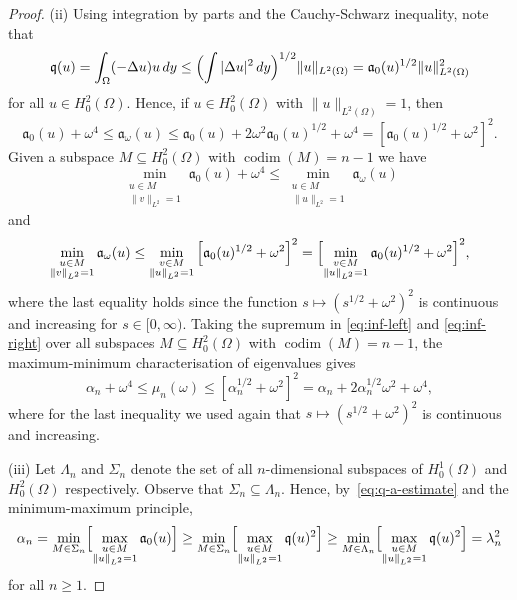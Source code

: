 \documentclass[a4paper, reqno]{amsart}
\numberwithin{equation}{section}
\theoremstyle{plain}
\theoremstyle{definition}
\theoremstyle{remark}
\DeclareMathOperator{\codim}{codim}
\newcommand{\mfra}{\mathfrak{a}}
\newcommand{\mfrq}{\mathfrak{q}}
\begin{document}
\begin{proof}
  (ii) Using integration by parts and the Cauchy-Schwarz inequality, note that
  \begin{equation}
    \label{eq:q-a-estimate}
    \mfrq(u)
    =\int_\Omega (-\Delta u)u\,dy
    \leq \Bigl(\int|\Delta u|^2\,dy\Bigr)^{1/2}\|u\|_{L^2(\Omega)}
    =\mfra_0(u)^{1/2}\|u\|_{L^2(\Omega)}^2
  \end{equation}
  for all $u\in H_0^2(\Omega)$. Hence, if $u\in H_0^2(\Omega)$ with $\|u\|_{L^2(\Omega)}=1$, then
  \begin{equation*}
    \mfra_0(u)+\omega^4
    \leq \mfra_\omega(u)
    \leq \mfra_0(u)+2\omega^2\mfra_0(u)^{1/2}+\omega^4
    =\left[\mfra_0(u)^{1/2}+\omega^2\right]^2.
  \end{equation*}
  Given a subspace $M\subseteq H_0^2(\Omega)$ with $\codim(M)=n-1$ we have
  \begin{equation}
    \label{eq:inf-left}
    \min_{\substack{u\in M\\\|v\|_{L^2}=1}}\mfra_0(u)+\omega^4
    \leq\min_{\substack{u\in M\\\|u\|_{L^2}=1}}\mfra_\omega(u)
  \end{equation}
  and
  \begin{equation}
    \label{eq:inf-right}
    \min_{\substack{u\in M\\\|v\|_{L^2}=1}}\mfra_\omega(u)
    \leq\min_{\substack{v\in M\\\|u\|_{L^2}=1}}
    \left[\mfra_0(u)^{1/2}+\omega^2\right]^2
    =\Bigl[\min_{\substack{v\in M\\\|u\|_{L^2}=1}}\mfra_0(u)^{1/2}+\omega^2\Bigr]^2,
  \end{equation}
  where the last equality holds since the function $s\mapsto (s^{1/2}+\omega^2)^2$ is continuous and increasing for $s\in[0,\infty)$. Taking the supremum in \eqref{eq:inf-left} and \eqref{eq:inf-right} over all subspaces $M\subseteq H_0^2(\Omega)$ with $\codim(M)=n-1$, the maximum-minimum characterisation of eigenvalues gives
  \begin{equation*}
    \alpha_n+\omega^4\leq \mu_n(\omega)
    \leq\left[\alpha_n^{1/2}+\omega^2\right]^2
    =\alpha_n+2\alpha_n^{1/2}\omega^2+\omega^4,
  \end{equation*}
  where for the last inequality we used again that $s\mapsto (s^{1/2}+\omega^2)^2$ is continuous and increasing.

  (iii)  Let $\Lambda_n$ and $\Sigma_n$ denote the set of all $n$-dimensional subspaces of $H^1_0(\Omega)$ and $H^2_0(\Omega)$ respectively. Observe that $\Sigma_n\subseteq\Lambda_n$. Hence, by~\eqref{eq:q-a-estimate} and the minimum-maximum principle,
  \begin{equation*}
    \alpha_n
    = \min_{M \in \Sigma_n} \Bigl[\max_{\substack{u\in M\\\|u\|_{L^2}=1}}\mfra_0(u)\Bigr]
    \geq \min_{M \in \Sigma_n} \Bigl[\max_{\substack{u\in M\\\|u\|_{L^2}=1}}\mfrq(u)^2\Bigr]
    \geq \min_{M \in \Lambda_n} \Bigl[\max_{\substack{u\in M\\\|u\|_{L^2}=1}}\mfrq(u)^2\Bigr]
    =\lambda_n^2
  \end{equation*}
  for all $n \ge 1$.
\end{proof}
\end{document}
